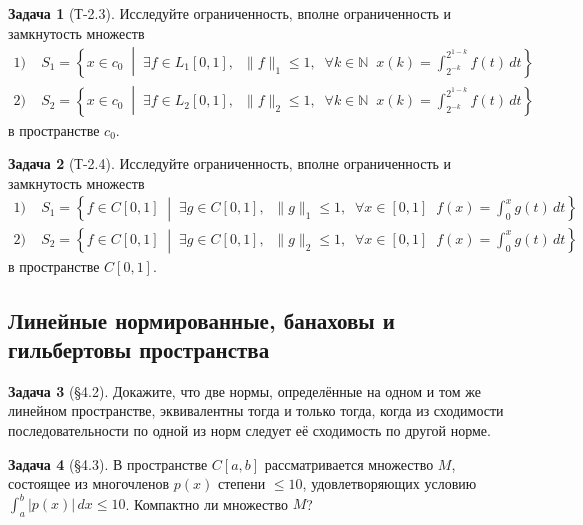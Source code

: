 \documentclass{article}
\theoremstyle{definition}
\newtheorem{problem}{Задача}
\newcommand{\N}{\mathbb N}
\begin{document}
\begin{problem}[Т-2.3]
Исследуйте ограниченность, вполне ограниченность и замкнутость множеств
\begin{equation*}
\begin{aligned}
1) \; & S_1 = \left\{x \in c_0 \;\middle|\; \exists f\in L_1[0,1], \;\; \|f\|_1 \le 1, \;\; \forall k\in \N 
\;\; x(k)=\int_{2^{-k}}^{2^{1-k}} f(t)\, dt \right\} \\
2) \; & S_2 = \left\{x \in c_0 \;\middle|\; \exists f\in L_2[0,1], \;\; \|f\|_2 \le 1, \;\; \forall k\in \N 
\;\; x(k)=\int_{2^{-k}}^{2^{1-k}} f(t)\, dt \right\}
\end{aligned}
\end{equation*}
в пространстве $c_0$.
\end{problem}

\begin{problem}[Т-2.4]
Исследуйте ограниченность, вполне ограниченность и замкнутость множеств
\begin{equation*}
\begin{aligned}
1) \; & S_1 = \left\{f \in C[0,1] \;\middle|\; \exists g\in C[0,1], \;\; \|g\|_1 \le 1, \;\; \forall x\in [0,1] \;\; f(x) = \int_0^x g(t)\, dt \right\} \\
2) \; & S_2 = \left\{f \in C[0,1] \;\middle|\; \exists g\in C[0,1], \;\; \|g\|_2 \le 1, \;\; \forall x\in [0,1] \;\; f(x) = \int_0^x g(t)\, dt \right\}
\end{aligned}
\end{equation*}
в пространстве $C[0,1]$.
\end{problem}

\subsection{Линейные нормированные, банаховы и гильбертовы пространства}

\begin{problem}[\S 4.2]
Докажите, что две нормы, определённые на одном и том же линейном пространстве,
эквивалентны тогда и только тогда, когда из сходимости последовательности по одной из норм
следует её сходимость по другой норме.
\end{problem}

\begin{problem}[\S 4.3]
В пространстве $C[a,b]$ рассматривается множество $M$, состоящее из многочленов $p(x)$
степени $\le 10$, удовлетворяющих условию $\int_a^b |p(x)|\, dx \le 10$.
Компактно ли множество $M$?
\end{problem}
\end{document}
